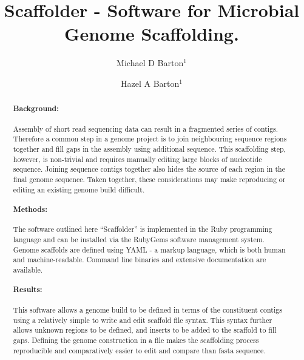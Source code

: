 \documentclass[10pt]{bmc_article}
\newenvironment{bmcformat}{\begin{raggedright}\baselineskip20pt\sloppy\setboolean{publ}{false}}{\end{raggedright}\baselineskip20pt\sloppy}
\begin{document}
\begin{bmcformat}

\title{Scaffolder - Software for Microbial Genome Scaffolding.} %

\author{
  Michael D Barton$^{1}$\correspondingauthor%
\and
  Hazel A Barton$^1$%
      }

\address{\iid(1) Department of Biological Sciences, Northern Kentucky %
University, Nunn Drive, Highland Heights, KY 41076 }%

\maketitle

\clearpage

\begin{abstract} %

  \paragraph*{Background:} Assembly of short read sequencing data can result in
  a fragmented series of contigs. Therefore a common step in a genome project
  is to join neighbouring sequence regions together and fill gaps in the
  assembly using additional sequence. This scaffolding step, however, is
  non-trivial and requires manually editing large blocks of nucleotide
  sequence. Joining sequence contigs together also hides the source of each
  region in the final genome sequence. Taken together, these considerations may
  make reproducing or editing an existing genome build difficult.

  \paragraph*{Methods:} The software outlined here ``Scaffolder'' is
  implemented in the Ruby programming language and can be installed via the
  RubyGems software management system. Genome scaffolds are defined using
  YAML - a markup language, which is both human and machine-readable. Command
  line binaries and extensive documentation are available.

  \paragraph*{Results:} This software allows a genome build to be defined in
  terms of the constituent contigs using a relatively simple to write and edit
  scaffold file syntax. This syntax further allows  unknown regions to be
  defined, and inserts to be added to the scaffold to fill gaps. Defining the
  genome construction in a file makes the scaffolding process reproducible and
  comparatively easier to edit and compare than fasta sequence.


\end{abstract}
\end{bmcformat}
\end{document}
